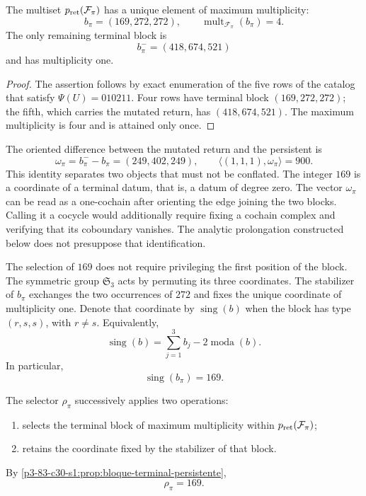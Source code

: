 \begin{proposition}
\label{p3-83-c30-s1:prop:bloque-terminal-persistente}
The multiset \(p_{\rm ret}(\mathcal F_\pi)\) has a unique element of
maximum multiplicity:
\[
b_\pi=(169,272,272),
\qquad
\operatorname{mult}_{\mathcal F_\pi}(b_\pi)=4.
\]
The only remaining terminal block is
\[
b_\pi^-=(418,674,521)
\]
and has multiplicity one.
\end{proposition}

\begin{proof}
The assertion follows by exact enumeration of the five rows of the
catalog that satisfy \(\Psi(U)=010211\). Four rows have terminal
block \((169,272,272)\); the fifth, which carries the mutated return, has
\((418,674,521)\). The maximum multiplicity is four and is attained only
once.
\end{proof}

The oriented difference between the mutated return and the persistent is
\[
 \omega_\pi=b_\pi^- - b_\pi=(249,402,249),
 \qquad
 \langle(1,1,1),\omega_\pi\rangle=900.
\]
This identity separates two objects that must not be conflated. The integer
\(169\) is a coordinate of a terminal datum, that is, a datum of degree
zero. The vector \(\omega_\pi\) can be read as a one-cochain
after orienting the edge joining the two blocks. Calling it a cocycle would additionally
require fixing a cochain complex and verifying that its coboundary vanishes.
The analytic prolongation constructed below does not presuppose that
identification.

The selection of \(169\) does not require privileging the first position of the block. The symmetric group \(\mathfrak S_3\) acts by permuting its three coordinates. The stabilizer of \(b_\pi\) exchanges the two occurrences of \(272\) and fixes the unique coordinate of multiplicity one. Denote that coordinate by \(\operatorname{sing}(b)\) when the block has type \((r,s,s)\), with \(r\ne s\). Equivalently,
\[
\operatorname{sing}(b)
=\sum_{j=1}^3b_j-2\operatorname{moda}(b).
\]
In particular,
\[
\boxed{\operatorname{sing}(b_\pi)=169.}
\]

\begin{definition}
\label{p3-83-c30-s1:def:selector-residual-pi}
The selector \(\rho_\pi\) successively applies two operations:
\begin{enumerate}
  \item selects the terminal block of maximum multiplicity within
  \(p_{\rm ret}(\mathcal F_\pi)\);
  \item retains the coordinate fixed by the stabilizer of that block.
\end{enumerate}
By \cref{p3-83-c30-s1:prop:bloque-terminal-persistente},
\[
\boxed{\rho_\pi=169.}
\]
\end{definition}

